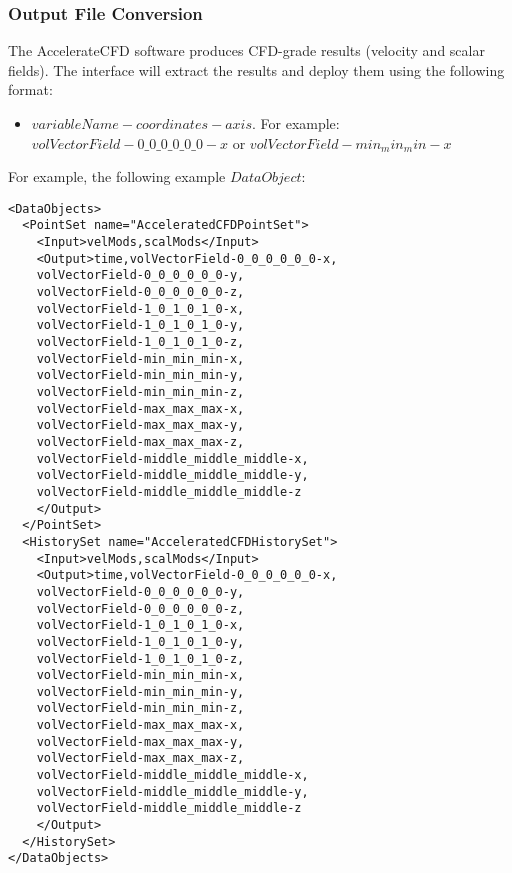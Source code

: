 \subsubsection{Output File Conversion}
The AccelerateCFD software produces CFD-grade results (velocity and scalar fields). The interface
will extract the results and deploy them using the following format:
\begin{itemize}
  \item $variableName-coordinates-axis$. For example: $volVectorField-0\_0\_0\_0\_0\_0-x$ or $volVectorField-min_min_min-x$
\end{itemize}
For example, the following example $DataObject$:
\begin{lstlisting}[style=XML]
<DataObjects>
  <PointSet name="AcceleratedCFDPointSet">
    <Input>velMods,scalMods</Input>
    <Output>time,volVectorField-0_0_0_0_0_0-x,
    volVectorField-0_0_0_0_0_0-y,
    volVectorField-0_0_0_0_0_0-z,
    volVectorField-1_0_1_0_1_0-x,
    volVectorField-1_0_1_0_1_0-y,
    volVectorField-1_0_1_0_1_0-z,
    volVectorField-min_min_min-x,
    volVectorField-min_min_min-y,
    volVectorField-min_min_min-z,
    volVectorField-max_max_max-x,
    volVectorField-max_max_max-y,
    volVectorField-max_max_max-z,
    volVectorField-middle_middle_middle-x,
    volVectorField-middle_middle_middle-y,
    volVectorField-middle_middle_middle-z
    </Output>
  </PointSet>
  <HistorySet name="AcceleratedCFDHistorySet">
    <Input>velMods,scalMods</Input>
    <Output>time,volVectorField-0_0_0_0_0_0-x,
    volVectorField-0_0_0_0_0_0-y,
    volVectorField-0_0_0_0_0_0-z,
    volVectorField-1_0_1_0_1_0-x,
    volVectorField-1_0_1_0_1_0-y,
    volVectorField-1_0_1_0_1_0-z,
    volVectorField-min_min_min-x,
    volVectorField-min_min_min-y,
    volVectorField-min_min_min-z,
    volVectorField-max_max_max-x,
    volVectorField-max_max_max-y,
    volVectorField-max_max_max-z,
    volVectorField-middle_middle_middle-x,
    volVectorField-middle_middle_middle-y,
    volVectorField-middle_middle_middle-z
    </Output>
  </HistorySet>
</DataObjects>
\end{lstlisting}

